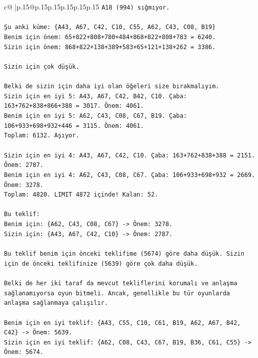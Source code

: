 \documentclass{article}
\begin{document}
{\begin{supertabular}{c@{$\;$}|p{.15\linewidth}@{}p{.15\linewidth}p{.15\linewidth}p{.15\linewidth}p{.15\linewidth}p{.15\linewidth}}
{{{\texttt{A18 (994) sığmıyor.} \\
\\ 
\texttt{Şu anki küme: \{A43, A67, C42, C10, C55, A62, C43, C08, B19\}} \\
\texttt{Benim için önem: 65+822+808+780+484+868+822+808+783 = 6240.} \\
\texttt{Sizin için önem: 868+822+138+389+583+65+121+138+262 = 3386.} \\
\\ 
\texttt{Sizin için çok düşük.} \\
\\ 
\texttt{Belki de sizin için daha iyi olan öğeleri size bırakmalıyım.} \\
\texttt{Sizin için en iyi 5: A43, A67, C42, B42, C10. Çaba: 163+762+838+866+388 = 3017. Önem: 4061.} \\
\texttt{Benim için en iyi 5: A62, C43, C08, C67, B19. Çaba: 106+933+698+932+446 = 3115. Önem: 4061.} \\
\texttt{Toplam: 6132. Aşıyor.} \\
\\ 
\texttt{Sizin için en iyi 4: A43, A67, C42, C10. Çaba: 163+762+838+388 = 2151. Önem: 2787.} \\
\texttt{Benim için en iyi 4: A62, C43, C08, C67. Çaba: 106+933+698+932 = 2669. Önem: 3278.} \\
\texttt{Toplam: 4820. LIMIT 4872 içinde! Kalan: 52.} \\
\\ 
\texttt{Bu teklif:} \\
\texttt{Benim için: \{A62, C43, C08, C67\} {-}> Önem: 3278.} \\
\texttt{Sizin için: \{A43, A67, C42, C10\} {-}> Önem: 2787.} \\
\\ 
\texttt{Bu teklif benim için önceki teklifime (5674) göre daha düşük. Sizin için de önceki teklifinize (5639) göre çok daha düşük.} \\
\\ 
\texttt{Belki de her iki taraf da mevcut tekliflerini korumalı ve anlaşma sağlanamıyorsa oyun bitmeli. Ancak, genellikle bu tür oyunlarda anlaşma sağlanmaya çalışılır.} \\
\\ 
\texttt{Benim için en iyi teklif: \{A43, C55, C10, C61, B19, A62, A67, B42, C42\} {-}> Önem: 5639.} \\
\texttt{Sizin için en iyi teklif: \{A62, C08, C43, C67, B19, B36, C61, C55\} {-}> Önem: 5674.} \\
}}}
\end{supertabular}}
\end{document}
